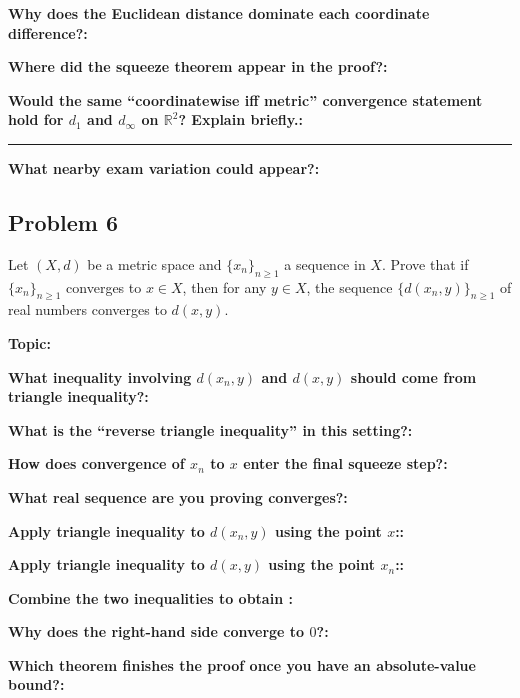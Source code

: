 \documentclass[12pt]{article}
\newcommand{\fillfield}[1]{%
  \par\noindent\textbf{#1:}\enspace\hrulefill\par\vspace{3pt}%
}
\newcommand{\fillfieldlong}[1]{%
  \par\noindent\textbf{#1:}\par\vspace{1.5cm}%
  \noindent\rule{\linewidth}{0.35pt}\par\vspace{4pt}%
}
\begin{document}
\bigskip

\begin{tcolorbox}[
  enhanced, breakable,
  colback  = reflectcyan,
  colframe = cyan!55!black,
  fonttitle = \bfseries,
  title = {\textsc{Reflection \& Variation}}
]
\fillfield{Why does the Euclidean distance dominate each coordinate difference?}
\fillfield{Where did the squeeze theorem appear in the proof?}
\fillfieldlong{Would the same ``coordinatewise iff metric'' convergence statement hold for $d_1$ and $d_\infty$ on $\mathbb{R}^2$? Explain briefly.}
\fillfield{What nearby exam variation could appear?}
\end{tcolorbox}

\newpage
\subsection{Problem 6}

\begin{tcolorbox}[
  enhanced, breakable,
  colback  = probblue,
  colframe = blue!55!black,
  fonttitle = \bfseries,
  title = {\textsc{Problem Statement}\hfill Homework 9, Problem 6}
]
Let $(X, d)$ be a metric space and $\{x_n\}_{n\ge1}$ a sequence in $X$. Prove that if
$\{x_n\}_{n\ge1}$ converges to $x \in X$, then for any $y \in X$, the sequence
$\{d(x_n, y)\}_{n\ge1}$ of real numbers converges to $d(x, y)$.
\end{tcolorbox}

\bigskip

\begin{tcolorbox}[
  enhanced, breakable,
  colback  = pass1green,
  colframe = green!55!black,
  fonttitle = \bfseries,
  title = {Pass 1 \enspace\textbf{--}\enspace First Diagnosis}
]
\fillfield{Topic}
\fillfield{What inequality involving $d(x_n,y)$ and $d(x,y)$ should come from triangle inequality?}
\fillfield{What is the ``reverse triangle inequality'' in this setting?}
\fillfield{How does convergence of $x_n$ to $x$ enter the final squeeze step?}
\fillfield{What real sequence are you proving converges?}
\end{tcolorbox}

\bigskip

\begin{tcolorbox}[
  enhanced, breakable,
  colback  = pass2yellow,
  colframe = yellow!65!black,
  fonttitle = \bfseries,
  title = {Pass 2 \enspace\textbf{--}\enspace Proof Recipe Card}
]
\fillfield{Apply triangle inequality to $d(x_n,y)$ using the point $x$:}
\fillfield{Apply triangle inequality to $d(x,y)$ using the point $x_n$:}
\fillfield{Combine the two inequalities to obtain \dotfill}
\fillfield{Why does the right-hand side converge to $0$?}
\fillfield{Which theorem finishes the proof once you have an absolute-value bound?}
\end{tcolorbox}
\end{document}
